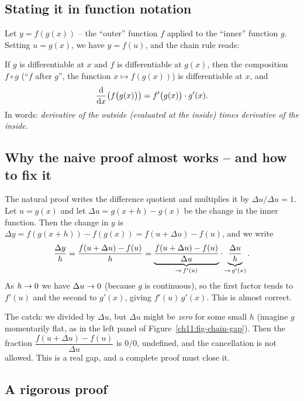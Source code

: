 \subsection{Stating it in function notation}

Let $y = f(g(x))$ -- the ``outer'' function $f$ applied to the ``inner'' function $g$.
Setting $u = g(x)$, we have $y = f(u)$, and the chain rule reads:

\begin{theorem}\label{ch11:thm-chain}
If $g$ is differentiable at $x$ and $f$ is differentiable at $g(x)$, then the composition
$f\circ g$ (``$f$ after $g$'', the function $x\mapsto f(g(x))$) is differentiable at
$x$, and
\[
  \frac{\mathrm{d}}{\mathrm{d} x}\!\left(f\big(g(x)\big)\right) = f'\big(g(x)\big)\cdot g'(x).
\]
In words: \emph{derivative of the outside (evaluated at the inside) times derivative of
the inside.}
\end{theorem}

\subsection{Why the naive proof almost works -- and how to fix it}

The natural proof writes the difference quotient and multiplies it by
$\Delta u/\Delta u = 1$. Let $u=g(x)$ and let $\Delta u = g(x+h)-g(x)$ be the change in the inner function.
Then the change in $y$ is $\Delta y = f(g(x+h)) - f(g(x)) = f(u+\Delta u) - f(u)$, and we
write
\[
  \frac{\Delta y}{h}
  = \frac{f(u+\Delta u) - f(u)}{h}
  = \underbrace{\frac{f(u+\Delta u) - f(u)}{\Delta u}}_{\to\, f'(u)}
    \cdot
    \underbrace{\frac{\Delta u}{h}}_{\to\, g'(x)}.
\]
As $h\to 0$ we have $\Delta u \to 0$ (because $g$ is continuous), so the first factor
tends to $f'(u)$ and the second to $g'(x)$, giving $f'(u)\,g'(x)$. This is almost
correct.

\begin{trapbox}
The catch: we divided by $\Delta u$, but $\Delta u$ might be \emph{zero} for some small
$h$ (imagine $g$ momentarily flat, as in the left panel of
Figure~\ref{ch11:fig-chain-gap}). Then the fraction $\dfrac{f(u+\Delta u)-f(u)}{\Delta
u}$ is $0/0$, undefined, and the cancellation is not allowed. This is a real gap, and a
complete proof must close it.
\end{trapbox}

\subsection{A rigorous proof}

